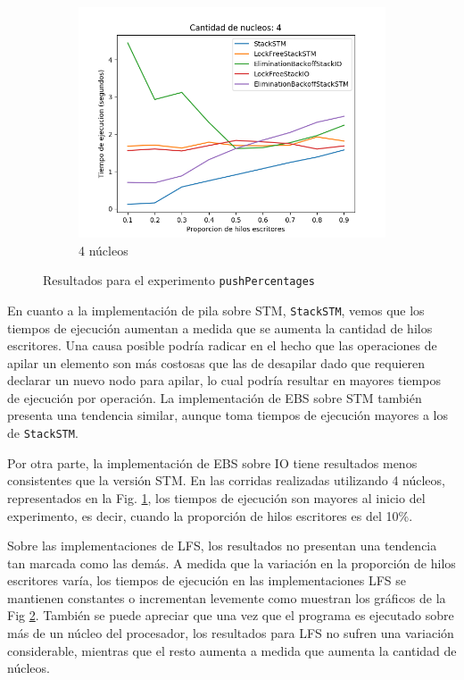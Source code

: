 \begin{figure}[t]
\begin{subfigure}[b]{0.5\textwidth}
        \includegraphics[width=\textwidth]{images/pushPercentages/plots/4.png}
        \caption{4 núcleos}
        \label{subfig:pushPercentages-4core}
    \end{subfigure}
    \caption{Resultados para el experimento \texttt{pushPercentages}}
    \label{fig:pushPercentages-all}
\end{figure}

En cuanto a la implementación de pila sobre STM, \texttt{StackSTM}, vemos que los tiempos de ejecución aumentan a medida que se aumenta la cantidad de hilos escritores.
Una causa posible podría radicar en el hecho que las operaciones de apilar un elemento son más costosas que las de desapilar dado que requieren declarar un nuevo nodo para apilar, lo cual podría resultar en mayores tiempos de ejecución por operación.
La implementación de EBS sobre STM también presenta una tendencia similar, aunque toma tiempos de ejecución mayores a los de \texttt{StackSTM}.

Por otra parte, la implementación de EBS sobre IO tiene resultados menos consistentes que la versión STM.
En las corridas realizadas utilizando 4 núcleos, representados en la Fig. \ref{subfig:pushPercentages-4core}, los tiempos de ejecución son mayores al inicio del experimento, es decir, cuando la proporción de hilos escritores es del 10\%.

Sobre las implementaciones de LFS, los resultados no presentan una tendencia tan marcada como las demás. A medida que la variación en la proporción de hilos escritores varía, los tiempos de ejecución en las implementaciones LFS se mantienen constantes o incrementan levemente como muestran los gráficos de la Fig \ref{fig:pushPercentages-all}. También se puede apreciar que una vez que el programa es ejecutado sobre más de un núcleo del procesador, los resultados para LFS no sufren una variación considerable, mientras que el resto aumenta a medida que aumenta la cantidad de núcleos.

